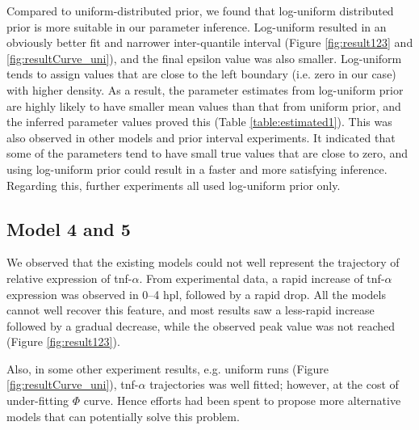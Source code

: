 Compared to uniform-distributed prior, we found that log-uniform distributed prior is more suitable in our parameter inference. Log-uniform resulted in an obviously better fit and narrower inter-quantile interval (Figure \ref{fig:result123} and \ref{fig:resultCurve_uni}), and the final epsilon value was also smaller. Log-uniform tends to assign values that are close to the left boundary (i.e. zero in our case) with higher density. As a result, the parameter estimates from log-uniform prior are highly likely to have smaller mean values than that from uniform prior, and the inferred parameter values proved this (Table \ref{table:estimated1}). This was also observed in other models and prior interval experiments. It indicated that some of the parameters tend to have small true values that are close to zero, and using log-uniform prior could result in a faster and more satisfying inference. Regarding this, further experiments all used log-uniform prior only.


\subsection{Model 4 and 5}


We observed that the existing models could not well represent the trajectory of relative expression of tnf-$\alpha$. From experimental data, a rapid increase of tnf-$\alpha$ expression was observed in 0--4 hpl, followed by a rapid drop. All the models cannot well recover this feature, and most results saw a less-rapid increase followed by a gradual decrease, while the observed peak value was not reached (Figure \ref{fig:result123}). 

Also, in some other experiment results, e.g. uniform runs (Figure \ref{fig:resultCurve_uni}), tnf-$\alpha$ trajectories was well fitted; however, at the cost of under-fitting $\Phi$ curve. Hence efforts had been spent to propose more alternative models that can potentially solve this problem.

